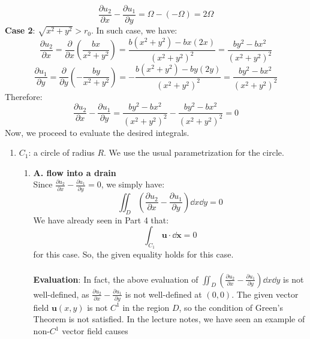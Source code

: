 \documentclass{article}
\begin{document}
\begin{enumerate}
\begin{equation}
  \frac{\partial u_2}{\partial x} - \frac{\partial u_1}{\partial y} = \Omega-(-\Omega) = 2\Omega
\end{equation}
\textbf{Case 2}: \(\sqrt{x^2+y^2}> r_0\). In such case, we have:
\begin{equation}
  \frac{\partial u_2}{\partial x} = \frac{\partial }{\partial x}\left(\frac{bx}{x^2+y^2}\right) = \frac{b(x^2+y^2)-bx(2x)}{(x^2+y^2)^2} = \frac{by^2 - bx^2}{ (x^2+y^2)^2}
\end{equation}
\begin{equation*}
  \frac{\partial u_1}{\partial y} = \frac{\partial}{\partial y}\left(-\frac{by}{x^2+y^2}\right) = -\frac{b(x^2+y^2)-by(2y)}{(x^2+y^2)^2} = \frac{by^2 - bx^2}{ (x^2+y^2)^2}
\end{equation*}
Therefore:
\begin{equation}
    \frac{\partial u_2}{\partial x} - \frac{\partial u_1}{\partial y} = \frac{by^2 - bx^2}{ (x^2+y^2)^2}-\frac{by^2 - bx^2}{ (x^2+y^2)^2}=0
\end{equation}
Now, we proceed to evaluate the desired integrals.
\begin{enumerate}
  \item \(C_1\): a circle of radius \(R\). We use the usual parametrization for the circle.
  \begin{enumerate}
    \item \textbf{A. flow into a drain}\\
    Since \(\frac{\partial u_2}{\partial x} - \frac{\partial u_1}{\partial y}=0\), we simply have:
    \begin{equation}
      \iint_D \left(\frac{\partial u_2}{\partial x} - \frac{\partial u_1}{\partial y}\right) \dd x\dd y =0
    \end{equation}
    We have already seen in Part 4 that:
    \begin{equation}
      \int_{C_1} \mathbf{u}\cdot \dd \mathbf{x} = 0
    \end{equation}
    for this case. So, the given equality holds for this case.\\
    \\
    \textbf{Evaluation}: In fact, the above evaluation of \(\iint_D \left(\frac{\partial u_2}{\partial x} - \frac{\partial u_1}{\partial y}\right) \dd x\dd y\) is not well-defined, as \(\frac{\partial u_2}{\partial x} - \frac{\partial u_1}{\partial y}\)
    is not well-defined at \((0,0)\). The given vector field \(\mathbf{u}(x,y)\) is not \(C^1\) in the region \(D\), so the condition of Green's Theorem is not satisfied. In the lecture notes, we have seen an example of non-\(C^1\) vector field causes

\end{enumerate}
\end{enumerate}
\end{enumerate}
\end{document}
